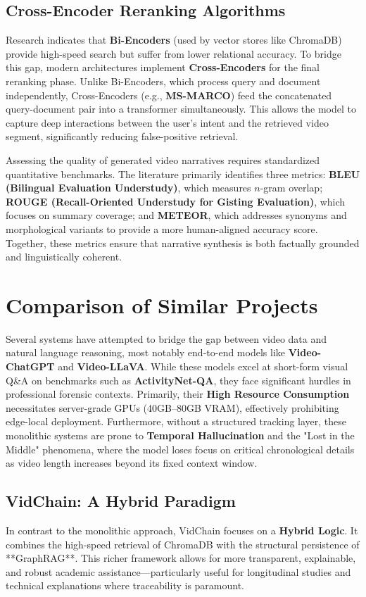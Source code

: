 \subsection{Cross-Encoder Reranking Algorithms}
Research indicates that \textbf{Bi-Encoders} (used by vector stores like ChromaDB) provide high-speed search but suffer from lower relational accuracy. To bridge this gap, modern architectures implement \textbf{Cross-Encoders} for the final reranking phase. Unlike Bi-Encoders, which process query and document independently, Cross-Encoders (e.g., \textbf{MS-MARCO}) feed the concatenated query-document pair into a transformer simultaneously. This allows the model to capture deep interactions between the user's intent and the retrieved video segment, significantly reducing false-positive retrieval.

Assessing the quality of generated video narratives requires standardized quantitative benchmarks. The literature primarily identifies three metrics: \textbf{BLEU (Bilingual Evaluation Understudy)}, which measures $n$-gram overlap; \textbf{ROUGE (Recall-Oriented Understudy for Gisting Evaluation)}, which focuses on summary coverage; and \textbf{METEOR}, which addresses synonyms and morphological variants to provide a more human-aligned accuracy score. Together, these metrics ensure that narrative synthesis is both factually grounded and linguistically coherent.

\section{Comparison of Similar Projects}
Several systems have attempted to bridge the gap between video data and natural language reasoning, most notably end-to-end models like \textbf{Video-ChatGPT} and \textbf{Video-LLaVA}. While these models excel at short-form visual Q\&A on benchmarks such as \textbf{ActivityNet-QA}, they face significant hurdles in professional forensic contexts. Primarily, their \textbf{High Resource Consumption} necessitates server-grade GPUs (40GB--80GB VRAM), effectively prohibiting edge-local deployment. Furthermore, without a structured tracking layer, these monolithic systems are prone to \textbf{Temporal Hallucination} and the "Lost in the Middle" phenomena, where the model loses focus on critical chronological details as video length increases beyond its fixed context window.

\subsection{VidChain: A Hybrid Paradigm}
In contrast to the monolithic approach, VidChain focuses on a \textbf{Hybrid Logic}. It combines the high-speed retrieval of ChromaDB with the structural persistence of **GraphRAG**. This richer framework allows for more transparent, explainable, and robust academic assistance—particularly useful for longitudinal studies and technical explanations where traceability is paramount.

